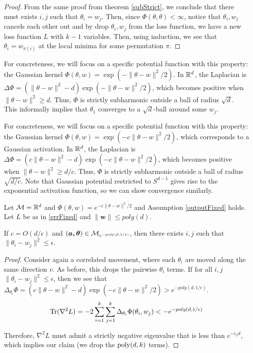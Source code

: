 \begin{proof}
From the same proof from theorem \ref{subStrict}, we conclude that there must exists $i, j$ such that $\theta_i = w_j$. Then, since $\Phi(\theta,\theta) < \infty$, notice that $\theta_i, w_j$ cancels each other out and by drop $\theta_i, w_j$ from the loss function, we have a new loss function $L$ with $k-1$ variables. Then, using induction, we see that $\theta_i = w_{\pi(i)}$ at the local minima for some permutation $\pi$.
\end{proof}


For concreteness, we will focus on a specific potential function with this property: the Gaussian kernel $\Phi(\theta, w) = \exp(-\|\theta - w\|^2/2)$. In ${\mathbb{R}}^d$, the Laplacian is $\Delta \Phi = ( \|\theta - w\|^2 -d ) \exp(-\|\theta - w\|^2/2)$, which becomes positive when $\|\theta - w \|^2 \geq d$. Thus, $\Phi$ is strictly subharmonic outside a ball of radius $\sqrt{d}$. This informally implies that $\theta_1$ converges to a $\sqrt{d}$-ball around some $w_j$. 





For concreteness, we will focus on a specific potential function with
this property: the Gaussian kernel $\Phi(\theta, w) = \exp(-c\|\theta
- w\|^2/2)$, which corresponds to a Gaussian activation. In ${\mathbb{R}}^d$, the Laplacian is $\Delta \Phi = ( c\|\theta - w\|^2 -d ) \exp(-c\|\theta - w\|^2/2)$, which becomes positive when
$\|\theta - w \|^2 \geq d/c$. Thus, $\Phi$ is strictly subharmonic
outside a ball of radius $\sqrt{d/c}$. Note that Gaussian potential
restricted to $S^{d-1}$ gives rise to the exponential activation
function, so we can show convergence similarly.  
%
\begin{theorem}\label{gaussStrict}
\label{GaussStrict}
Let $\mathcal{M} = {\mathbb{R}}^d$ and $\Phi(\theta,w) = e^{-c\|\theta-w\|^2/2}$ and Assumption \ref{outputFixed} holds. Let $L$ be as in \eqref{errFixed} and $\|\boldsymbol{w}\|\leq poly(d)$. 

If $c = O(d/\epsilon)$ and $(\boldsymbol{a,\theta}) \in \mathcal{M}_{e^{-\mathrm{poly}(d,1/\epsilon)}}$, then there exists $i, j$ such that $\| \theta_i - w_j \|^2 \leq \epsilon$.
\end{theorem}

\begin{proof}
Consider again a correlated movement, where each $\theta_i$ are moved along the same direction $v$. As before, this drops the pairwise $\theta_i$ terms. If for all $i, j$ $\| \theta_i - w_j \|^2 \leq \epsilon$, then we see that $\Delta_{\theta_i} \Phi = ( c\|\theta - w\|^2 -d ) \exp(-c\|\theta - w\|^2/2) > e^{-poly(d,1/\epsilon)}$. 
%
\[\operatorname{Tr}(\nabla^2 L) = -2\sum_{i=1}^k \sum_{j=1}^k \Delta_{\theta_i}\Phi(\theta_i, w_j) < -e^{-poly(d,1/\epsilon)}\]

Therefore, $\nabla^2 L$ must admit a strictly negative eigenvalue that
is less than $e^{-c_3 d}$, which implies our claim (we drop the
$\mathrm{poly}(d,k)$ terms).


\end{proof}

